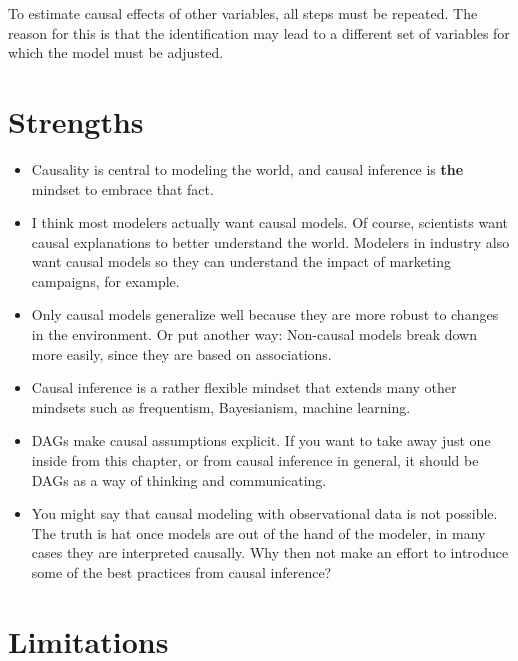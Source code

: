 \documentclass[
  10pt,
]{scrbook}
\providecommand{\tightlist}{%
  \setlength{\itemsep}{0pt}\setlength{\parskip}{0pt}}
\begin{document}
To estimate causal effects of other variables, all steps must be repeated.
The reason for this is that the identification may lead to a different set of variables for which the model must be adjusted.

\hypertarget{strengths-4}{%
\section{Strengths}\label{strengths-4}}

\begin{itemize}
\tightlist
\item
  Causality is central to modeling the world, and causal inference is \textbf{the} mindset to embrace that fact.
\item
  I think most modelers actually want causal models. Of course, scientists want causal explanations to better understand the world. Modelers in industry also want causal models so they can understand the impact of marketing campaigns, for example.
\item
  Only causal models generalize well because they are more robust to changes in the environment. Or put another way: Non-causal models break down more easily, since they are based on associations.
\item
  Causal inference is a rather flexible mindset that extends many other mindsets such as frequentism, Bayesianism, machine learning.
\item
  DAGs make causal assumptions explicit. If you want to take away just one inside from this chapter, or from causal inference in general, it should be DAGs as a way of thinking and communicating.
\item
  You might say that causal modeling with observational data is not possible. The truth is hat once models are out of the hand of the modeler, in many cases they are interpreted causally. Why then not make an effort to introduce some of the best practices from causal inference?
\end{itemize}

\hypertarget{limitations-4}{%
\section{Limitations}\label{limitations-4}}
\end{document}
